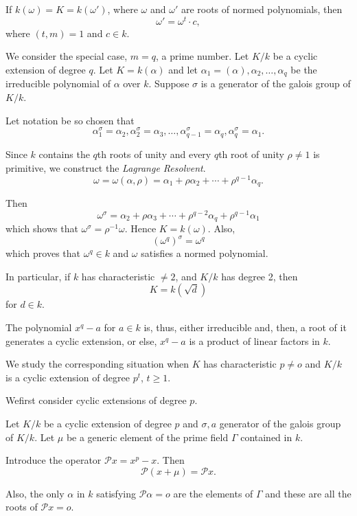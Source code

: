 \begin{coro*}  %
 If $k(\omega)=K = k(\omega')$, where $\omega$ and $\omega'$ are
  roots of normed polynomials, then 
$$
\omega' = \omega^t \cdot c ,
$$\pageoriginale
where $(t,m)=1$ and $c \in k $.
\end{coro*}

We consider the special case, $m=q$, a prime number. Let $K/k$ be a
cyclic extension of degree $q$. Let $K=k(\alpha)$ and let
$\alpha_1=(\alpha),\alpha_2,\ldots,\alpha_q$ be the irreducible
polynomial of $\alpha $ over $k$. Suppose $\sigma$ is a generator of
the galois group of $K/k$. 

Let notation be so chosen that
$$
\alpha^\sigma_1=\alpha_2, \alpha^\sigma_2=\alpha_3,\ldots ,
\alpha^\sigma_{q-1}=\alpha_q, \alpha^\sigma_q=\alpha_1. 
$$

Since $k$ contains the $q$th roots of unity and every $q$th root of
unity $\rho \neq 1$ is primitive, we construct the \textit{Lagrange
  Resolvent}. 
$$
\omega = \omega (\alpha, \rho) = \alpha_1 + \rho \alpha_2 + \cdots +
\rho^{q-1} \alpha_ q. 
$$

Then
$$
\omega^\sigma = \alpha_2 +\rho \alpha_3 + \cdots +\rho^{q-2} \alpha_q
+ \rho^{q-1} \alpha_1 
$$
which shows that $\omega^\sigma = \rho^{-1} \omega$. Hence
$K=k(\omega)$. Also, 
$$
(\omega^q)^{\sigma} = \omega^q
$$
which proves that $\omega^q \in k$ and $\omega$ satisfies a normed
polynomial. 

In particular, if $k$ has characteristic $\neq 2$, and $K/k$ has
degree 2, then 
$$
K = k(\surd d)
$$
for $d \in k$.

The polynomial $x^q -a$ for $a \in k$ is, thus, either irreducible
and, then, a root of it generates a cyclic extension, or else, $x^q-a$
is a product of linear factors in $k$. 

We study the corresponding situation when $K$ has characteristic $p
\neq o$ and $K/k$ is a cyclic extension of degree $p^t$, $t \geq 1$. 

We\pageoriginale first consider cyclic extensions of degree $p$. 

Let $K/k$ be a cyclic extension of degree $p$ and $\sigma, a$ generator
of the galois group of $K/k$. Let $\mu $ be a generic element of the
prime field $\Gamma$ contained in $k$. 

Introduce the operator $\mathscr{P}x=x^p-x$. Then
$$
\mathscr{P}(x+\mu)=\mathscr{P}x.
$$

Also, the only $\alpha$ in $k$ satisfying $\mathscr{P} \alpha =o$ are 
the elements of $\Gamma$ and these are all the roots of $\mathscr{P} x
= o$. 

